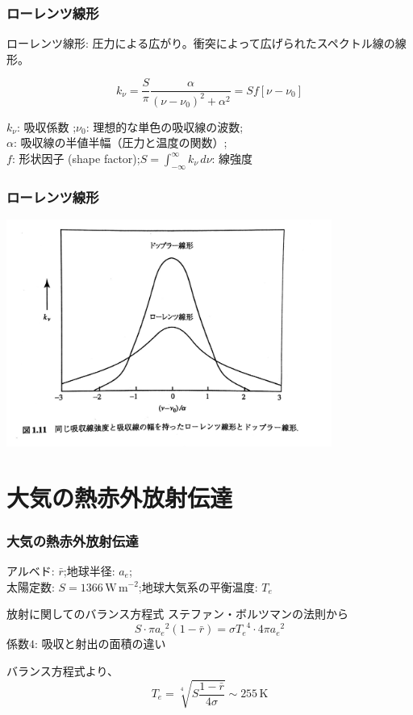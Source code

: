 \documentclass[unicode,colorlinks]{beamer}
\newcommand{\centeralign}[1]{\rule{0pt}{0pt}\hfill#1\hfill\rule{0pt}{0pt}}
\newcommand{\Unit}[1]{\,\mathrm{#1}}
\begin{document}
\begin{frame}
	\frametitle{ローレンツ線形}
	ローレンツ線形: 圧力による広がり。衝突によって広げられたスペクトル線の線形。

	\[k_\nu=\frac{S}{\pi}\frac{\alpha}{(\nu-\nu_0)^2+\alpha^2}=Sf[\nu-\nu_0]\]

	$k_\nu$: 吸収係数 ;\quad $\nu_0$: 理想的な単色の吸収線の波数;\\
	$\alpha$: 吸収線の半値半幅（圧力と温度の関数）;\\
	$f$: 形状因子 (shape factor);\quad $\displaystyle S=\int^\infty_{-\infty}k_\nu\,d\nu$: 線強度
\end{frame}

\begin{frame}
	\frametitle{ローレンツ線形}
	\centeralign{\includegraphics[width=0.8\textwidth]{lorentz.jpg}}
\end{frame}

\section{大気の熱赤外放射伝達}

\begin{frame}
	\frametitle{大気の熱赤外放射伝達}
	アルベド: $\bar r$;\quad 地球半径: $a_e$;\quad\\
	太陽定数: $S=1366\Unit{W\,m^{-2}}$;\quad 地球大気系の平衡温度: $T_e$
	\begin{block}{放射に関してのバランス方程式}
		ステファン・ボルツマンの法則から
		\[S\cdot\pi{a_e}^2(1-\bar r)=\sigma{T_e}^4\cdot4\pi{a_e}^2\]
		係数$4$: 吸収と射出の面積の違い

		バランス方程式より、
		\[T_e=\sqrt[4]{S\frac{1-\bar r}{4\sigma}}\sim255\Unit{K}\]
	\end{block}
\end{frame}
\end{document}
